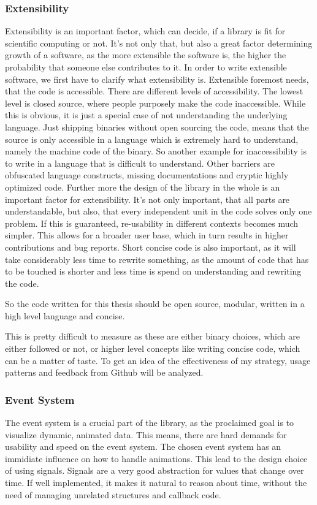 \subsubsection{Extensibility}
Extensibility is an important factor, which can decide, if a library is fit for scientific computing or not. 
It's not only that, but also a great factor determining growth of a software, as the more extensible the software is, the higher the probability that someone else contributes to it.
In order to write extensible software, we first have to clarify what extensibility is.
Extensible foremost needs, that the code is accessible. There are different levels of accessibility. The lowest level is closed source, where people purposely make the code inaccessible. While this is obvious, it is just a special case of not understanding the underlying language. Just shipping binaries without open sourcing the code, means that the source is only accessible in a language which is extremely hard to understand, namely the machine code of the binary. So another example for inaccessibility is to write in a language that is difficult to understand. Other barriers are obfuscated language constructs, missing documentations and cryptic highly optimized code.
Further more the design of the library in the whole is an important factor for extensibility. It's not only important, that all parts are understandable, but also, that every independent unit in the code solves only one problem.
If this is guaranteed, re-usability in different contexts becomes much simpler. This allows for a broader user base, which in turn results in higher contributions and bug reports.
Short concise code is also important, as it will take considerably less time to rewrite something, as the amount of code that has to be touched is shorter and less time is spend on understanding and rewriting the code.

So the code written for this thesis should be open source, modular, written in a high level language and concise.

This is pretty difficult to measure as these are either binary choices, which are either followed or not, 
or higher level concepts like writing concise code, which can be a matter of taste.
To get an idea of the effectiveness of my strategy, usage patterns and feedback from Github will be analyzed.

\subsubsection{Event System}
The event system is a crucial part of the library, as the proclaimed goal is to visualize dynamic, animated data.
This means, there are hard demands for usability and speed on the event system.
The chosen event system has an immidiate influence on how to handle animations. 
This lead to the design choice of using signals. Signals are a very good abstraction for values that change over time.
If well implemented, it makes it natural to reason about time, without the need of managing unrelated structures and callback code.


